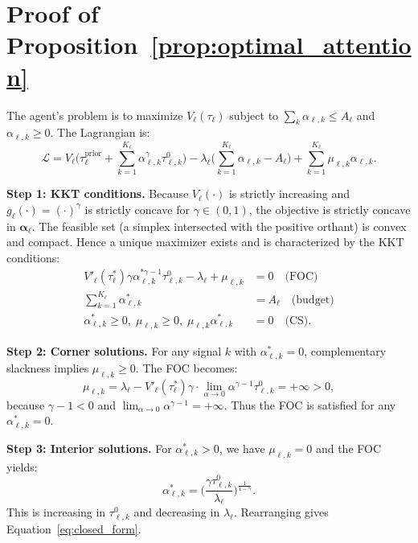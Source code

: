 \section{Proof of Proposition~\ref{prop:optimal_attention}}
\label{app:proof_prop1}

The agent's problem is to maximize $V_\ell(\tau_\ell)$ subject to $\sum_k \alpha_{\ell,k} \leq A_\ell$ and $\alpha_{\ell,k} \geq 0$. The Lagrangian is:
\begin{equation*}
\mathcal{L} = V_\ell\Biggl(\tau^{\text{prior}}_\ell + \sum_{k=1}^{K_\ell} \alpha_{\ell,k}^\gamma \tau^0_{\ell,k}\Biggr) - \lambda_\ell\Biggl(\sum_{k=1}^{K_\ell} \alpha_{\ell,k} - A_\ell\Biggr) + \sum_{k=1}^{K_\ell} \mu_{\ell,k} \alpha_{\ell,k}.
\end{equation*}

\textbf{Step 1: KKT conditions.} Because $V_\ell(\cdot)$ is strictly increasing and $g_\ell(\cdot) = (\cdot)^\gamma$ is strictly concave for $\gamma \in (0,1)$, the objective is strictly concave in $\boldsymbol{\alpha}_\ell$. The feasible set (a simplex intersected with the positive orthant) is convex and compact. Hence a unique maximizer exists and is characterized by the KKT conditions:
\begin{align}
V'_\ell(\tau^*_\ell) \gamma \alpha^{*\gamma-1}_{\ell,k} \tau^0_{\ell,k} - \lambda_\ell + \mu_{\ell,k} &= 0 \quad \text{(FOC)} \label{eq:kkt_foc}\\
\sum_{k=1}^{K_\ell} \alpha^*_{\ell,k} &= A_\ell \quad \text{(budget)} \label{eq:kkt_budget}\\
\alpha^*_{\ell,k} \geq 0, \; \mu_{\ell,k} \geq 0, \; \mu_{\ell,k} \alpha^*_{\ell,k} &= 0 \quad \text{(CS)}. \label{eq:kkt_cs}
\end{align}

\textbf{Step 2: Corner solutions.} For any signal $k$ with $\alpha^*_{\ell,k} = 0$, complementary slackness implies $\mu_{\ell,k} \geq 0$. The FOC becomes:
\begin{equation*}
\mu_{\ell,k} = \lambda_\ell - V'_\ell(\tau^*_\ell) \gamma \cdot \lim_{\alpha \to 0} \alpha^{\gamma-1} \tau^0_{\ell,k} = +\infty > 0,
\end{equation*}
because $\gamma - 1 < 0$ and $\lim_{\alpha \to 0} \alpha^{\gamma-1} = +\infty$. Thus the FOC is satisfied for any $\alpha^*_{\ell,k} = 0$.

\textbf{Step 3: Interior solutions.} For $\alpha^*_{\ell,k} > 0$, we have $\mu_{\ell,k} = 0$ and the FOC yields:
\begin{equation*}
\alpha^*_{\ell,k} = \biggl(\frac{\gamma \tau^0_{\ell,k}}{\lambda_\ell}\biggr)^{\frac{1}{1-\gamma}}.
\end{equation*}
This is increasing in $\tau^0_{\ell,k}$ and decreasing in $\lambda_\ell$. Rearranging gives Equation~\eqref{eq:closed_form}.

